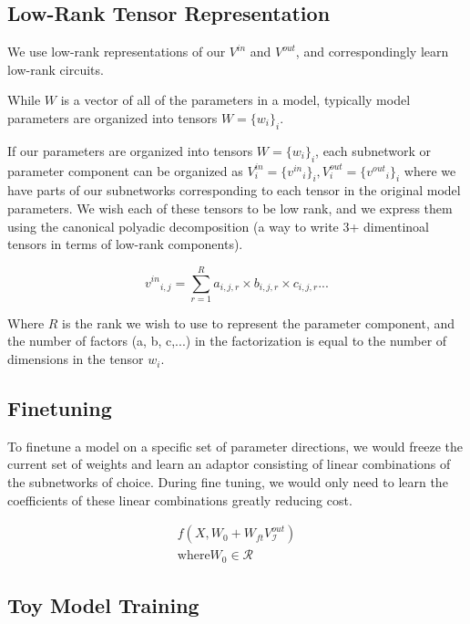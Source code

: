 \documentclass{article}
\theoremstyle{plain}
\theoremstyle{definition}
\theoremstyle{remark}
\begin{document}
\subsection{Low-Rank Tensor Representation}\label{sec:low_rank}

We use low-rank representations of our $V^{in}$ and $V^{out}$, and correspondingly learn low-rank circuits.

While $W$ is a vector of all of the parameters in a model, typically model parameters are organized into tensors $W=\{w_i\}_i$. 

If our parameters are organized into tensors $W=\{w_i\}_i$, each subnetwork or parameter component can be organized as $V^{in}_i  = {\{{v^{in}}_i\}}_i, V^{out}_i = {\{{v^{out}}_i\}}_i$ where we have parts of our subnetworks corresponding to each tensor in the original model parameters. We wish each of these tensors to be low rank, and we express them using the canonical polyadic decomposition \cite{} (a way to write 3+ dimentinoal tensors in terms of low-rank components).

\begin{equation}
{v^{in}}_{i,j} = \sum_{r=1}^{R} a_{i,j,r} \times b_{i,j,r} \times c_{i,j,r} ...
\end{equation}

Where $R$ is the rank we wish to use to represent the parameter component, and the number of factors (a, b, c,...) in the factorization is equal to the number of dimensions in the tensor $w_i$.

\subsection{Finetuning}\label{sec:finetuning}

To finetune a model on a specific set of parameter directions, we would freeze the current set of weights and learn an adaptor consisting of linear combinations of the subnetworks of choice. During fine tuning, we would only need to learn the coefficients of these linear combinations greatly reducing cost.

\begin{align}
    f(X, W_0 + W_{ft} V^{out}_\mathcal{I})\\
    \text{where} W_0 \in \mathcal{R}
    
\end{align}



\subsection{Toy Model Training}\label{sec:toymodel_hyperparams}
\end{document}
